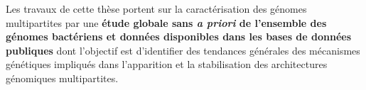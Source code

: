        Les travaux de cette thèse portent sur la caractérisation des génomes multipartites par une \textbf{étude globale sans \textit{a priori} de l'ensemble des génomes bactériens et données disponibles dans les bases de données publiques} dont l'objectif est d'identifier des tendances générales des mécanismes génétiques impliqués dans l'apparition et la stabilisation des architectures génomiques multipartites. 























    